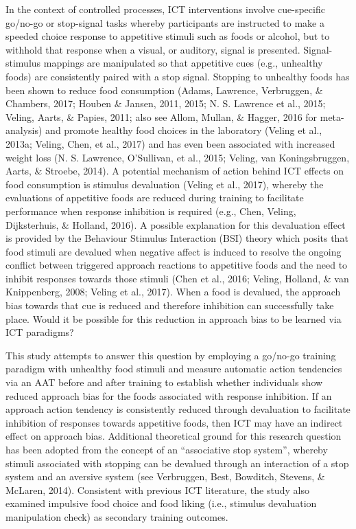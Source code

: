 \documentclass[man,floatsintext]{apa6}
\begin{document}
In the context of controlled processes, ICT interventions involve cue-specific go/no-go or stop-signal tasks whereby participants are instructed to make a speeded choice response to appetitive stimuli such as foods or alcohol, but to withhold that response when a visual, or auditory, signal is presented. Signal-stimulus mappings are manipulated so that appetitive cues (e.g., unhealthy foods) are consistently paired with a stop signal. Stopping to unhealthy foods has been shown to reduce food consumption (Adams, Lawrence, Verbruggen, \& Chambers, 2017; Houben \& Jansen, 2011, 2015; N. S. Lawrence et al., 2015; Veling, Aarts, \& Papies, 2011; also see Allom, Mullan, \& Hagger, 2016 for meta-analysis) and promote healthy food choices in the laboratory (Veling et al., 2013a; Veling, Chen, et al., 2017) and has even been associated with increased weight loss (N. S. Lawrence, O'Sullivan, et al., 2015; Veling, van Koningsbruggen, Aarts, \& Stroebe, 2014). A potential mechanism of action behind ICT effects on food consumption is stimulus devaluation (Veling et al., 2017), whereby the evaluations of appetitive foods are reduced during training to facilitate performance when response inhibition is required (e.g., Chen, Veling, Dijksterhuis, \& Holland, 2016). A possible explanation for this devaluation effect is provided by the Behaviour Stimulus Interaction (BSI) theory which posits that food stimuli are devalued when negative affect is induced to resolve the ongoing conflict between triggered approach reactions to appetitive foods and the need to inhibit responses towards those stimuli (Chen et al., 2016; Veling, Holland, \& van Knippenberg, 2008; Veling et al., 2017). When a food is devalued, the approach bias towards that cue is reduced and therefore inhibition can successfully take place. Would it be possible for this reduction in approach bias to be learned via ICT paradigms?

\par

This study attempts to answer this question by employing a go/no-go training paradigm with unhealthy food stimuli and measure automatic action tendencies via an AAT before and after training to establish whether individuals show reduced approach bias for the foods associated with response inhibition. If an approach action tendency is consistently reduced through devaluation to facilitate inhibition of responses towards appetitive foods, then ICT may have an indirect effect on approach bias. Additional theoretical ground for this research question has been adopted from the concept of an \enquote{associative stop system}, whereby stimuli associated with stopping can be devalued through an interaction of a stop system and an aversive system (see Verbruggen, Best, Bowditch, Stevens, \& McLaren, 2014). Consistent with previous ICT literature, the study also examined impulsive food choice and food liking (i.e., stimulus devaluation manipulation check) as secondary training outcomes.
\end{document}
